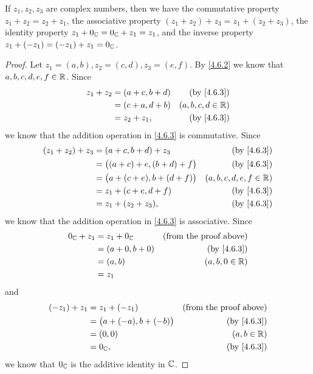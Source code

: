 \begin{lem}\label{4.6.4}
  If \(z_1, z_2, z_3\) are complex numbers, then we have the commutative property \(z_1 + z_2 = z_2 + z_1\), the associative property \((z_1 + z_2) + z_3 = z_1 + (z_2 + z_3)\), the identity property \(z_1 + 0_{\mathbb{C}} = 0_{\mathbb{C}} + z_1 = z_1\), and the inverse property \(z_1 + (-z_1) = (-z_1) + z_1 = 0_{\mathbb{C}}\).
\end{lem}

\begin{proof}
  Let \(z_1 = (a, b), z_2 = (c, d), z_3 = (e, f)\).
  By \cref{4.6.2} we know that \(a, b, c, d, e, f \in \mathbb{R}\).
  Since
  \begin{align*}
    z_1 + z_2 & = (a + c, b + d) & \text{(by \cref{4.6.3})} \\
              & = (c + a, d + b) & (a, b, c, d \in \R)      \\
              & = z_2 + z_1,     & \text{(by \cref{4.6.3})}
  \end{align*}
  we know that the addition operation in \cref{4.6.3} is commutative.
  Since
  \begin{align*}
    (z_1 + z_2) + z_3 & = (a + c, b + d) + z_3               & \text{(by \cref{4.6.3})}  \\
                      & = \big((a + c) + e, (b + d) + f\big) & \text{(by \cref{4.6.3})}  \\
                      & = \big(a + (c + e), b + (d + f)\big) & (a, b, c, d, e, f \in \R) \\
                      & = z_1 + (c + e, d + f)               & \text{(by \cref{4.6.3})}  \\
                      & = z_1 + (z_2 + z_3),                 & \text{(by \cref{4.6.3})}
  \end{align*}
  we know that the addition operation in \cref{4.6.3} is associative.
  Since
  \begin{align*}
    0_{\C} + z_1 & = z_1 + 0_{\C}   & \text{(from the proof above)} \\
                 & = (a + 0, b + 0) & \text{(by \cref{4.6.3})}      \\
                 & = (a, b)         & (a, b, 0 \in \R)              \\
                 & = z_1
  \end{align*}
  and
  \begin{align*}
    (-z_1) + z_1 & = z_1 + (-z_1)                 & \text{(from the proof above)} \\
                 & = \big(a + (-a), b + (-b)\big) & \text{(by \cref{4.6.3})}      \\
                 & = (0, 0)                       & (a, b \in \R)                 \\
                 & = 0_{\C},                      & \text{(by \cref{4.6.3})}
  \end{align*}
  we know that \(0_{\mathbb{C}}\) is the additive identity in \(\mathbb{C}\).
\end{proof}

